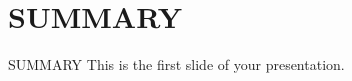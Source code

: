 \section{SUMMARY}
\begin{frame}{SUMMARY}
  This is the first slide of your presentation.
\end{frame}